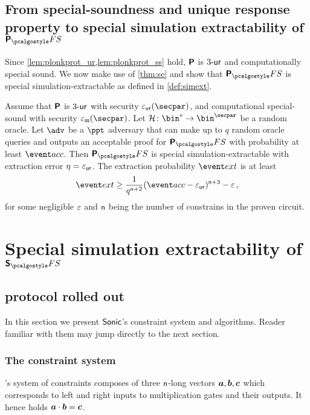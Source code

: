 \documentclass[runningheads,11pt]{llncs}
\begin{document}
\subsection{From special-soundness and unique response property to special simulation
  extractability of $\plonkprotfs$}

Since \cref{lem:plonkprot_ur,lem:plonkprot_ss} hold, $\bm{\mathsf{P}}$ is ${3\text{-}\mathsf{ur}}$
and computationally special sound. We now 
make use of \cref{thm:se} and show that
$\plonkprot_\fs$ is special simulation-extractable as defined in \cref{def:simext}.

\begin{corollary}
\label{thm:plonkprotfs_se}
Assume that $\bm{\mathsf{P}}$ is ${3\text{-}\mathsf{ur}}$ with security $\epsur(\secpar)$, and
computational special-sound with security $\epsss(\secpar)$. Let $\ro\colon
\bin^* \to \bin^\secpar$ be a random oracle. Let $\advse$ be a $\ppt$ adversary
that can make up to $q$ random oracle queries and outputs an acceptable proof
for $\plonkprotfs$ with probability at least $\accProb$. Then $\plonkprotfs$ is
special simulation-extractable with extraction error $\eta = \varepsilon_{\mathsf{ur}}$. The extraction
probability $\extProb$ is at least
\[
	\extProb \geq \frac{1}{q^{\noofc + 2}} (\accProb - \epsur)^{\noofc + 3} -\eps\,,
\]
for some negligible $\varepsilon$ and $\mathsf{n}$ being the number of
constrains in the proven circuit.
\end{corollary}

\section{Special simulation extractability of $\sonicprotfs$}
\label{sec:sonic}
\subsection{\sonic{} protocol rolled out}
In this section we present ${\textnormal{\textsf{Sonic}}}$'s constraint system and algorithms. Reader
familiar with them may jump directly to the next section.

\subsubsection{The constraint system}
\label{sec:sonic_constraint_system}
\sonic's system of constraints composes of three $\mathsf{n}$-long vectors
$\va, \vb, \vc$ which corresponds to left and right inputs to multiplication
gates and their outputs. It hence holds $\va \cdot \vb = \vc$.
\end{document}
